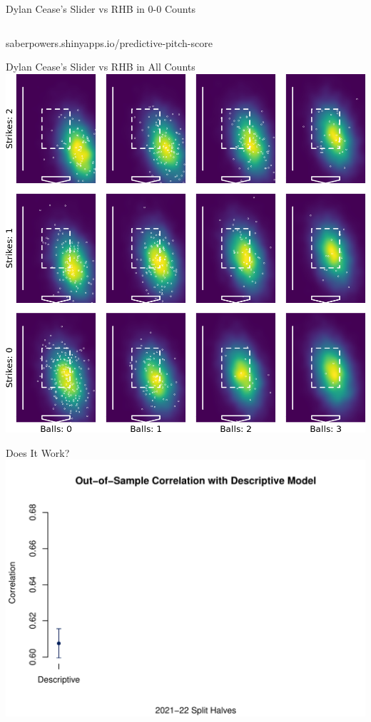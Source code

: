 \documentclass{beamer}
\begin{document}
\begin{frame}{Dylan Cease's Slider vs RHB in 0-0 Counts}
\begin{columns}
\begin{column}{0.5\textwidth}
      \end{column}
    \end{columns}
    \vfill
    \centering \scriptsize {\color{ricerichblue}saberpowers}{\color{ricegray}.shinyapps.io/}{\color{ricerichblue}predictive-pitch-score}\\
  \end{frame}

  \begin{frame}{Dylan Cease's Slider vs RHB in All Counts}
    \vfill
    \centering
    \includegraphics[height = 0.85\textheight]{images/656302_SL_R_plate.png}
  \end{frame}

  \begin{frame}{Does It Work?}
    \centering
    \includegraphics[width = \textwidth]{images/cor_overall_1.pdf}
  \end{frame}
\end{document}
